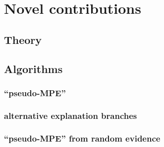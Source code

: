 \section{Novel contributions}\label{sec:novel-contributions}
\subsection{Theory}

\subsection{Algorithms}
\subsubsection{\enquote{pseudo-MPE}}
\subsubsection{alternative explanation branches}
\subsubsection{\enquote{pseudo-MPE} from random evidence}